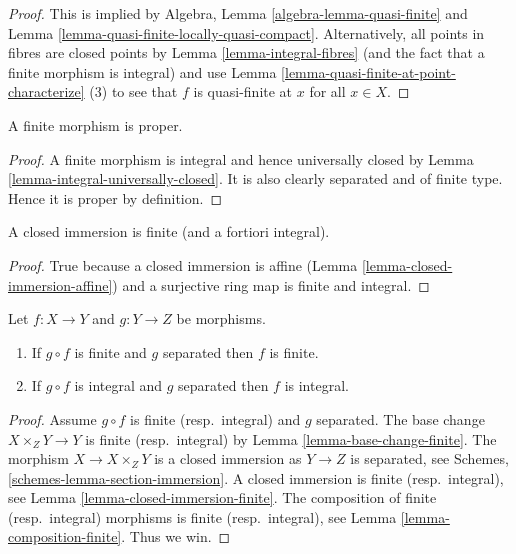 \begin{proof}
This is implied by Algebra, Lemma \ref{algebra-lemma-quasi-finite}
and Lemma \ref{lemma-quasi-finite-locally-quasi-compact}.
Alternatively, all points in fibres are closed points by
Lemma \ref{lemma-integral-fibres} (and the fact that a finite
morphism is integral) and use
Lemma \ref{lemma-quasi-finite-at-point-characterize} (3) to
see that $f$ is quasi-finite at $x$ for all $x \in X$.
\end{proof}

\begin{lemma}
\label{lemma-finite-proper}
A finite morphism is proper.
\end{lemma}

\begin{proof}
A finite morphism is integral and hence universally closed by
Lemma \ref{lemma-integral-universally-closed}. It is also
clearly separated and of finite type. Hence it is proper by
definition.
\end{proof}

\begin{lemma}
\label{lemma-closed-immersion-finite}
A closed immersion is finite (and a fortiori integral).
\end{lemma}

\begin{proof}
True because a closed immersion is affine
(Lemma \ref{lemma-closed-immersion-affine})
and a surjective ring map is finite and integral.
\end{proof}

\begin{lemma}
\label{lemma-finite-permanence}
Let $f : X \to Y$ and $g : Y \to Z$ be morphisms.
\begin{enumerate}
\item If $g \circ f$ is finite and $g$ separated then $f$ is finite.
\item If $g \circ f$ is integral and $g$ separated then $f$ is integral.
\end{enumerate}
\end{lemma}

\begin{proof}
Assume $g \circ f$ is finite (resp.\ integral) and $g$ separated.
The base change $X \times_Z Y \to Y$ is finite (resp.\ integral) by
Lemma \ref{lemma-base-change-finite}.
The morphism $X \to X \times_Z Y$ is
a closed immersion as $Y \to Z$ is separated, see
Schemes, \ref{schemes-lemma-section-immersion}.
A closed immersion is finite (resp.\ integral),
see Lemma \ref{lemma-closed-immersion-finite}.
The composition of finite (resp.\ integral) morphisms is finite
(resp.\ integral),
see Lemma \ref{lemma-composition-finite}. Thus we win.
\end{proof}

